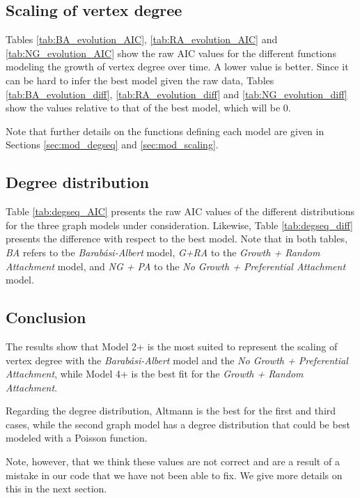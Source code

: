 
\subsection{Scaling of vertex degree}

Tables \ref{tab:BA_evolution_AIC}, \ref{tab:RA_evolution_AIC} and \ref{tab:NG_evolution_AIC} show the raw AIC values for the different functions modeling the growth of vertex degree over time. A lower value is better. Since it can be hard to infer the best model given the raw data, Tables \ref{tab:BA_evolution_diff}, \ref{tab:RA_evolution_diff} and \ref{tab:NG_evolution_diff} show the values relative to that of the best model, which will be 0.

Note that further details on the functions defining each model are given in Sections \ref{sec:mod_degseq} and \ref{sec:mod_scaling}.




\subsection{Degree distribution}

Table \ref{tab:degseq_AIC} presents the raw AIC values  of the different distributions for the three graph models under consideration. Likewise, Table \ref{tab:degseq_diff} presents the difference with respect to the best model. Note that in both tables, \textit{BA} refers to tbe \textit{Barabási-Albert} model, \textit{G+RA} to the \textit{Growth + Random Attachment} model, and \textit{NG + PA} to the \textit{No Growth + Preferential Attachment} model.




\subsection{Conclusion}

The results show that Model 2+ is the most suited to represent the scaling of vertex degree with the \textit{Barabási-Albert} model and the \textit{No Growth + Preferential Attachment}, while Model 4+ is the best fit for the \textit{Growth + Random Attachment}.

Regarding the degree distribution, Altmann is the best for the first and third cases, while the second graph model has a degree distribution that could be best modeled with a Poisson function.

Note, however, that we think these values are not correct and are a result of a mistake in our code that we have not been able to fix. We give more details on this in the next section.